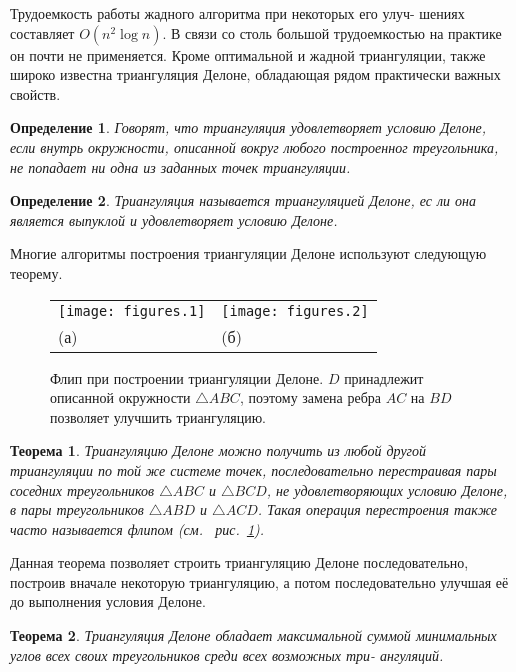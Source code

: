 \documentclass[a4paper]{article}
\newtheorem{define}{Определение}
\newtheorem{theorem}{Теорема}
\begin{document}
Трудоемкость работы жадного алгоритма при некоторых его улуч- шениях
составляет $O(n^2 \log n)$. В связи со столь большой трудоемкостью
на практике он почти не применяется. Кроме оптимальной и жадной
триангуляции, также широко известна триангуляция Делоне, обладающая
рядом практически важных свойств.

\begin{define}
  Говорят, что триангуляция удовлетворяет условию Делоне, если внутрь
  окружности, описанной вокруг любого построенног треугольника, не
  попадает ни одна из заданных точек триангуляции.
\end{define}

\begin{define}
  Триангуляция называется триангуляцией Делоне, ес ли она является
  выпуклой и удовлетворяет условию Делоне.
\end{define}

Многие  алгоритмы  построения  триангуляции  Делоне  используют 
следующую теорему.

\begin{figure}
  \begin{tabularx}{\textwidth}{YY}
    \texttt{[image: figures.1]} & \texttt{[image: figures.2]} \\
    (а) & (б) \\
  \end{tabularx}
  \caption{Флип при построении триангуляции Делоне. $D$ принадлежит
    описанной окружности $\triangle ABC$, поэтому замена ребра $AC$
    на $BD$ позволяет улучшить триангуляцию.}
  \label{fig:flip}
\end{figure}

\begin{theorem}
  Триангуляцию Делоне можно получить из любой другой триангуляции по
  той же системе точек, последовательно перестраивая пары соседних
  треугольников $\triangle ABC$ и $\triangle BCD$, не удовлетворяющих
  условию Делоне, в пары треугольников $\triangle ABD$ и $\triangle
  ACD$. Такая операция перестроения также часто называется флипом
  (см.~ рис.~\ref{fig:flip}).
\end{theorem}

Данная теорема позволяет строить триангуляцию Делоне последовательно,
построив вначале некоторую триангуляцию, а потом последовательно
улучшая её до выполнения условия Делоне.

\begin{theorem}
Триангуляция  Делоне  обладает  максимальной  суммой
минимальных углов всех своих треугольников среди всех возможных три-
ангуляций.
\end{theorem}
\end{document}
